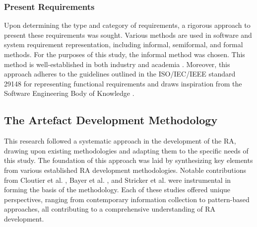 \documentclass[review]{elsarticle}
\begin{document}




\subsubsection{Present Requirements}


Upon determining the type and category of requirements, a rigorous approach to present these requirements was sought. Various methods are used in software and system requirement representation, including informal, semiformal, and formal methods. For the purposes of this study, the informal method was chosen. This method is well-established in both industry and academia \cite{kassab2014state}. Moreover, this approach adheres to the guidelines outlined in the ISO/IEC/IEEE standard 29148 \cite{ISO29148} for representing functional requirements and draws inspiration from the Software Engineering Body of Knowledge \cite{abran2004software}. 


\subsection{The Artefact Development Methodology}

This research followed a systematic approach in the development of the RA, drawing upon existing methodologies and adapting them to the specific needs of this study. The foundation of this approach was laid by synthesizing key elements from various established RA development methodologies. Notable contributions from Cloutier et al. \cite{Cloutier}, Bayer et al. \cite{bayer2004definition}, and Stricker et al. \cite{stricker2010creating} were instrumental in forming the basis of the methodology. Each of these studies offered unique perspectives, ranging from contemporary information collection to pattern-based approaches, all contributing to a comprehensive understanding of RA development.
\end{document}
